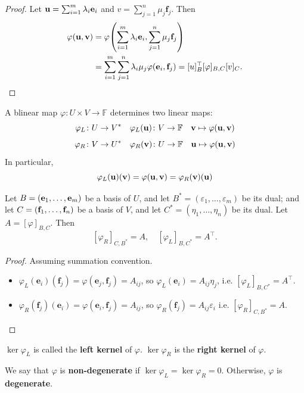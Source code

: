 \documentclass[a4paper,11pt]{article}
\renewcommand{\epsilon}{\varepsilon}
\begin{document}
\begin{proof}
	Let $ {\bf u} = \sum_{i=1}^m \lambda_i {\bf e}_i $ and $ v = \sum_{j=1}^n \mu_j \mathbf{f}_j $.
	Then
	\begin{align*}
        \varphi({\bf u},{\bf v}) &= \varphi\qty( \sum_{i=1}^m \lambda_i \mathbf{e}_i, \sum_{j=1}^n \mu_j \mathbf{f}_j ) \\ 
        &= \sum_{i=1}^m \sum_{j=1}^n \lambda_i \mu_j \varphi(\mathbf{e}_i,\mathbf{f}_j) = [u]_B^\top [\varphi]_{B,C} [v]_C. \qedhere
    \end{align*}
\end{proof}

\begin{definition}
	A blinear map $ \varphi: U\times V \to \mathbb{F} $ determines two linear maps: 
	\[
		\varphi_L \colon U \to V^* \quad \varphi_L({\bf u}) \colon V \to {\mathbb{F}} \quad {\bf v} \mapsto \varphi({\bf u},{\bf v})
	\]
	\[
		\varphi_R \colon V \to U^* \quad \varphi_R({\bf v}) \colon U \to {\mathbb{F}} \quad {\bf u} \mapsto \varphi({\bf u},{\bf v})
	\]
	In particular,
	\[
		\varphi_L({\bf u})({\bf v}) = \varphi({\bf u},{\bf v}) = \varphi_R({\bf v})({\bf u})
	\]
\end{definition}

\begin{lemma}
	Let $ B = ({\bf e}_1, \dots, {\bf e}_m) $ be a basis of $ U $, and let $ B^* = (\varepsilon_1, \dots, \varepsilon_m) $ be its dual; and let $ C = ({\bf f}_1, \dots, {\bf f}_n) $ be a basis of $ V $, and let $ C^* = (\eta_1, \dots, \eta_n) $ be its dual.
	Let $ A = [\varphi]_{B,C} $.
	Then
	\[
		[\varphi_R]_{C, B^*} = A,\quad [\varphi_L]_{B, C^*} = A^\top.
	\]
\end{lemma}
\begin{proof}
    Assuming summation convention.
    \begin{itemize}
        \item $ \varphi_L(\mathbf{e}_i)(\mathbf{f}_j) = \varphi(\mathbf{e}_j,\mathbf{f}_j) = A_{ij} $, so $ \varphi_L(\mathbf{e}_i) = A_{ij}\eta_j $, i.e. $  [\varphi_L]_{B, C^*} = A^\top $. 
        \item $ \varphi_R(\mathbf{f}_j)(\mathbf{e}_i) = \varphi(\mathbf{e}_i,\mathbf{f}_j) = A_{ij} $, so $ \varphi_R(\mathbf{f}_j) = A_{ij}\epsilon_i $ i.e. $ [\varphi_R]_{C, B^*} = A $. \qedhere
    \end{itemize}
\end{proof}
\begin{definition}
	$ \ker \varphi_L $ is called the \textbf{left kernel} of $ \varphi $.
	$ \ker \varphi_R $ is the \textbf{right kernel} of $ \varphi $.
\end{definition}
\begin{definition}
	We say that $ \varphi $ is \textbf{non-degenerate} if $ \ker \varphi_L = \ker \varphi_R = \qty{0} $.
	Otherwise, $ \varphi $ is \textbf{degenerate}.
\end{definition}
\end{document}
